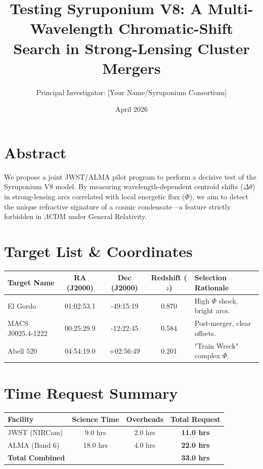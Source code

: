 \documentclass[11pt, a4paper]{article}
\title{\textbf{Testing Syruponium V8: A Multi-Wavelength Chromatic-Shift Search in Strong-Lensing Cluster Mergers}}
\author{Principal Investigator: [Your Name/Syruponium Consortium]}
\date{April 2026}
\begin{document}
\maketitle

\section{Abstract}
We propose a joint JWST/ALMA pilot program to perform a decisive test of the Syruponium V8 model. By measuring wavelength-dependent centroid shifts ($\Delta\theta$) in strong-lensing arcs correlated with local energetic flux ($\Phi$), we aim to detect the unique refractive signature of a cosmic condensate—a feature strictly forbidden in $\Lambda$CDM under General Relativity.

\section{Target List \& Coordinates}
\begin{table}[h!]
\centering
\begin{tabular}{l c c c p{4cm}}
\toprule
\textbf{Target Name} & \textbf{RA (J2000)} & \textbf{Dec (J2000)} & \textbf{Redshift ($z$)} & \textbf{Selection Rationale} \\
\midrule
El Gordo & 01:02:53.1 & -49:15:19 & 0.870 & High $\Phi$ shock, bright arcs. \\
MACS J0025.4-1222 & 00:25:29.9 & -12:22:45 & 0.584 & Post-merger, clear offsets. \\
Abell 520 & 04:54:19.0 & +02:56:49 & 0.201 & "Train Wreck" complex $\Phi$. \\
\bottomrule
\end{tabular}
\end{table}

\section{Time Request Summary}
\begin{table}[h!]
\centering
\begin{tabular}{l c c c}
\toprule
\textbf{Facility} & \textbf{Science Time} & \textbf{Overheads} & \textbf{Total Request} \\
\midrule
JWST (NIRCam) & 9.0 hrs & 2.0 hrs & \textbf{11.0 hrs} \\
ALMA (Band 6) & 18.0 hrs & 4.0 hrs & \textbf{22.0 hrs} \\
\midrule
\textbf{Total Combined} & & & \textbf{33.0 hrs} \\
\bottomrule
\end{tabular}
\end{table}
\end{document}
